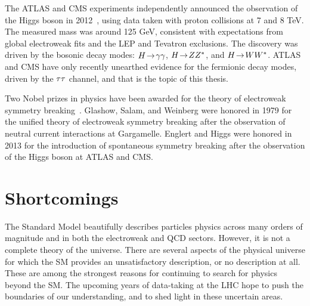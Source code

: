 The ATLAS and CMS experiments independently announced the observation of the Higgs boson in 2012~\cite{HIGG-2012-27,2012.cms-higgs}, using data taken with proton collisions at 7 and 8 TeV. The measured mass was around 125 GeV, consistent with expectations from global electroweak fits and the LEP and Tevatron exclusions. The discovery was driven by the bosonic decay modes: $H \!\rightarrow\! \gamma\gamma$, $H \!\rightarrow\! ZZ^\ast$, and $H \!\rightarrow\! WW^\ast$. ATLAS and CMS have only recently unearthed evidence for the fermionic decay modes, driven by the $\tau\tau$ channel, and that is the topic of this thesis.

Two Nobel prizes in physics have been awarded for the theory of electroweak symmetry breaking~\cite{nobelprizes}. Glashow, Salam, and Weinberg were honored in 1979 for the unified theory of electroweak symmetry breaking after the observation of neutral current interactions at Gargamelle. Englert and Higgs were honored in 2013 for the introduction of spontaneous symmetry breaking after the observation of the Higgs boson at ATLAS and CMS.

\section{Shortcomings}

The Standard Model beautifully describes particles physics across many orders of magnitude and in both the electroweak and QCD sectors. However, it is not a complete theory of the universe. There are several aspects of the physical universe for which the SM provides an unsatisfactory description, or no description at all. These are among the strongest reasons for continuing to search for physics beyond the SM. The upcoming years of data-taking at the LHC hope to push the boundaries of our understanding, and to shed light in these uncertain areas.

